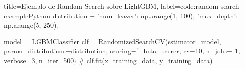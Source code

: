 \begin{code}[numbers=left]{title=Ejemplo de Random Search sobre LightGBM, label=code:random-search-example}{Python}
    distribution = {
        'num_leaves': np.arange(1, 100),
        'max_depth': np.arange(5, 250),
    }

    model = LGBMClassifier
    clf = RandomizedSearchCV(estimator=model, param_distributions=distribution,
                             scoring=f_beta_scorer, cv=10,
                             n_jobs=-1, verbose=3, n_iter=500)
    # clf.fit(x_training_data, y_training_data)
\end{code}